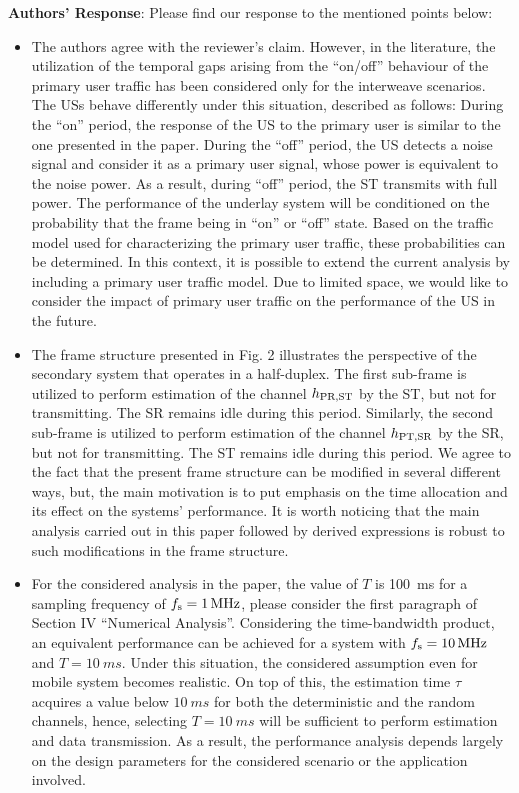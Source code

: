 \documentclass[12pt,a4wide,peerreview]{IEEEtran}
\begin{document}
\textbf{Authors' Response}:
Please find our response to the mentioned points below:
\begin{itemize}
\item The authors agree with the reviewer's claim. However, in the literature, the utilization of the temporal gaps arising from the ``on/off'' behaviour of the primary user traffic has been considered only for the interweave scenarios. The USs behave differently under this situation, described as follows: During the ``on'' period, the response of the US to the primary user is similar to the one presented in the paper. During the ``off'' period, the US detects a noise signal and consider it as a primary user signal, whose power is equivalent to the noise power. As a result, during ``off'' period, the ST transmits with full power. The performance of the underlay system will be conditioned on the probability that the frame being in ``on'' or ``off'' state. Based on the traffic model used for characterizing the primary user traffic, these probabilities can be determined. In this context, it is possible to extend the current analysis by including a primary user traffic model. Due to limited space, we would like to consider the impact of primary user traffic on the performance of the US in the future.  
\item The frame structure presented in Fig. 2 illustrates the perspective of the secondary system that operates in a half-duplex. The first sub-frame is utilized to perform estimation of the channel $h_{\text{PR,ST}}$ by the ST, but not for transmitting. The SR remains idle during this period. Similarly, the second sub-frame is utilized to perform estimation of the channel $h_{\text{PT,SR}}$ by the SR, but not for transmitting. The ST remains idle during this period. We agree to the fact that the present frame structure can be modified in several different ways, but, the main motivation is to put emphasis on the time allocation and its effect on the systems' performance. It is worth noticing that the main analysis carried out in this paper followed by derived expressions is robust to such modifications in the frame structure. 
\item For the considered analysis in the paper, the value of $T$ is \SI{100}{ms} for a sampling frequency of $f_{\text{s}} = \SI{1}{MHz}$, please consider the first paragraph of Section IV ``Numerical Analysis''. Considering the time-bandwidth product, an equivalent performance can be achieved for a system with $f_{\text{s}} = \SI{10}{MHz}$ and $T = \SI{10}{ms}$. Under this situation, the considered assumption even for mobile system becomes realistic. On top of this, the estimation time $\tau$ acquires a value below $\SI{10}{ms}$ for both the deterministic and the random channels, hence, selecting $T = \SI{10}{ms}$ will be sufficient to perform estimation and data transmission. As a result, the performance analysis depends largely on the design parameters for the considered scenario or the application involved. 
\end{itemize}
\end{document}
